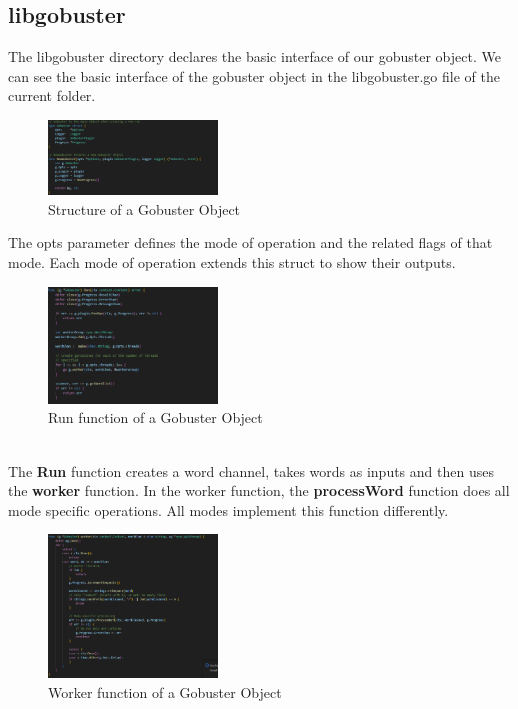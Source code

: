 \documentclass[12 pt]{article}
\begin{document}
\subsection{libgobuster}
The libgobuster directory declares the basic interface of our gobuster object. We can see the basic interface of the gobuster object in the libgobuster.go file of the current folder.
\begin{figure}[!htbp]
    \centering
    \includegraphics[width=0.4\textwidth]{Gobuster_struct.png}
    \caption{Structure of a Gobuster Object}
    \label{fig: Gobuster struct}
\end{figure}
The opts parameter defines the mode of operation and the related flags of that mode. Each mode of operation extends this struct to show their outputs.\\
\begin{figure}[!htbp]
    \centering
    \includegraphics[width=0.4\textwidth]{Libgobuster_Run.png}
    \caption{Run function of a Gobuster Object}
    \label{fig: Libgobuster Run}
\end{figure} \\
The \textbf{Run} function creates a word channel, takes words as inputs and then uses the \textbf{worker} function. In the worker function, the \textbf{processWord} function does all mode specific operations. All modes implement this function differently.\\
\begin{figure}[!htbp]
    \centering
    \includegraphics[width=0.4\textwidth]{Libgobuster_Worker.png}
    \caption{Worker function of a Gobuster Object}
    \label{fig: Libgobuster Worker}
\end{figure} \\
\end{document}
